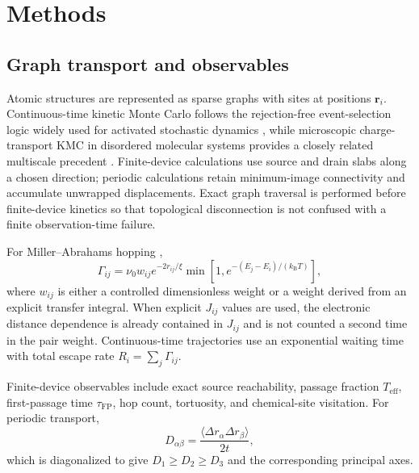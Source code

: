 \documentclass[aps,prmaterials,reprint,amsmath,amssymb,superscriptaddress,longbibliography]{revtex4-2}
\newcommand{\kb}{k_{\mathrm B}}
\newcommand{\taufp}{\tau_{\mathrm{FP}}}
\newcommand{\Teff}{T_{\mathrm{eff}}}
\begin{document}
\section{Methods}
\subsection{Graph transport and observables}
Atomic structures are represented as sparse graphs with sites at positions $\mathbf r_i$. Continuous-time kinetic Monte Carlo follows the rejection-free event-selection logic widely used for activated stochastic dynamics \cite{bortz1975,andersen2019}, while microscopic charge-transport KMC in disordered molecular systems provides a closely related multiscale precedent \cite{bassler1993,ruhle2011,vehoff2010,nenashev2015,shuai2014}. Finite-device calculations use source and drain slabs along a chosen direction; periodic calculations retain minimum-image connectivity and accumulate unwrapped displacements. Exact graph traversal is performed before finite-device kinetics so that topological disconnection is not confused with a finite observation-time failure.

For Miller--Abrahams hopping \cite{miller1960},
\begin{equation}
\Gamma_{ij}=\nu_0 w_{ij}e^{-2r_{ij}/\xi}\min\!\left[1,e^{-(E_j-E_i)/(\kb T)}\right],
\end{equation}
where $w_{ij}$ is either a controlled dimensionless weight or a weight derived from an explicit transfer integral. When explicit $J_{ij}$ values are used, the electronic distance dependence is already contained in $J_{ij}$ and is not counted a second time in the pair weight. Continuous-time trajectories use an exponential waiting time with total escape rate $R_i=\sum_j\Gamma_{ij}$.

Finite-device observables include exact source reachability, passage fraction $\Teff$, first-passage time $\taufp$, hop count, tortuosity, and chemical-site visitation. For periodic transport,
\begin{equation}
D_{\alpha\beta}=\frac{\langle\Delta r_\alpha\Delta r_\beta\rangle}{2t},
\end{equation}
which is diagonalized to give $D_1\ge D_2\ge D_3$ and the corresponding principal axes.
\end{document}
